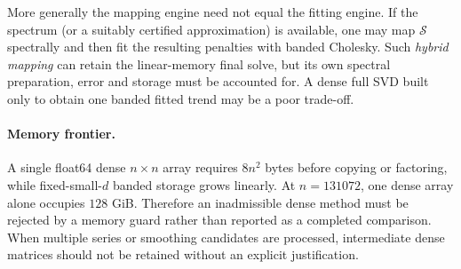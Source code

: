 More generally the mapping engine need not equal the fitting engine. If the spectrum (or a suitably certified approximation) is available, one may map $\mathcal S$ spectrally and then fit the resulting penalties with banded Cholesky. Such \emph{hybrid mapping} can retain the linear-memory final solve, but its own spectral preparation, error and storage must be accounted for. A dense full SVD built only to obtain one banded fitted trend may be a poor trade-off.

\paragraph{Memory frontier.}
A single float64 dense $n\times n$ array requires $8n^2$ bytes before copying or factoring, while fixed-small-$d$ banded storage grows linearly. At $n=131072$, one dense array alone occupies $128$ GiB. Therefore an inadmissible dense method must be rejected by a memory guard rather than reported as a completed comparison. When multiple series or smoothing candidates are processed, intermediate dense matrices should not be retained without an explicit justification.
